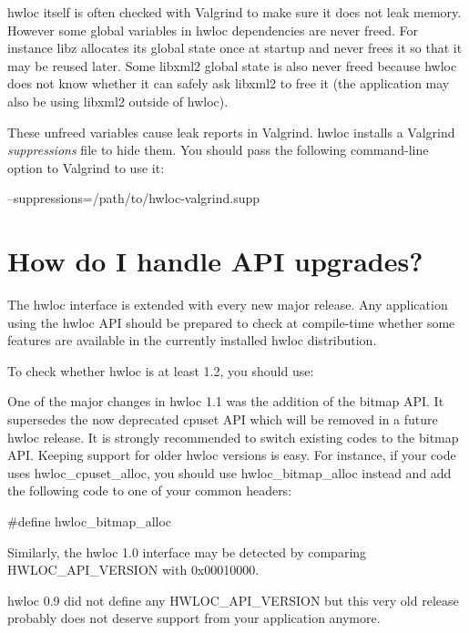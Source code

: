 hwloc itself is often checked with Valgrind to make sure it does not leak memory. However some global variables in hwloc dependencies are never freed. For instance libz allocates its global state once at startup and never frees it so that it may be reused later. Some libxml2 global state is also never freed because hwloc does not know whether it can safely ask libxml2 to free it (the application may also be using libxml2 outside of hwloc).

These unfreed variables cause leak reports in Valgrind. hwloc installs a Valgrind {\itshape suppressions\/} file to hide them. You should pass the following command-\/line option to Valgrind to use it: 
\begin{DoxyPre}
  --suppressions=/path/to/hwloc-valgrind.supp
\end{DoxyPre}
\hypertarget{a00011_faq_upgrade}{}\section{How do I handle API upgrades?}\label{a00011_faq_upgrade}
The hwloc interface is extended with every new major release. Any application using the hwloc API should be prepared to check at compile-\/time whether some features are available in the currently installed hwloc distribution.

To check whether hwloc is at least 1.2, you should use: \begin{DoxyVerb}




\end{DoxyVerb}


One of the major changes in hwloc 1.1 was the addition of the bitmap API. It supersedes the now deprecated cpuset API which will be removed in a future hwloc release. It is strongly recommended to switch existing codes to the bitmap API. Keeping support for older hwloc versions is easy. For instance, if your code uses {\ttfamily hwloc\_\-cpuset\_\-alloc}, you should use {\ttfamily hwloc\_\-bitmap\_\-alloc} instead and add the following code to one of your common headers: \begin{DoxyVerb}


#define hwloc_bitmap_alloc

\end{DoxyVerb}


Similarly, the hwloc 1.0 interface may be detected by comparing {\ttfamily HWLOC\_\-API\_\-VERSION} with {\ttfamily 0x00010000}.

hwloc 0.9 did not define any {\ttfamily HWLOC\_\-API\_\-VERSION} but this very old release probably does not deserve support from your application anymore. 